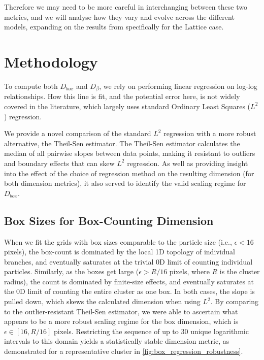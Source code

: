 \documentclass[12pt, a4paper, oneside]{report}
\theoremstyle{remark}
\begin{document}
Therefore we may need to be more careful in interchanging between these two metrics, and we will analyse how they vary and evolve across the different models, expanding on the results from \cite{Grebenkov2017} specifically for the Lattice case.

\section{Methodology}
\label{sec:dim_method}
To compute both $D_{box}$ and $D_\beta$, we rely on performing linear regression on log-log relationships. How this line is fit, and the potential error here, is not widely covered in the literature, which largely uses standard Ordinary Least Squares ($L^2$) regression.

We provide a novel comparison of the standard $L^2$ regression with a more robust alternative, the Theil-Sen estimator. The Theil-Sen estimator calculates the median of all pairwise slopes between data points, making it resistant to outliers and boundary effects that can skew $L^2$ regression. As well as providing insight into the effect of the choice of regression method on the resulting dimension (for both dimension metrics), it also served to identify the valid scaling regime for $D_{box}$.

\subsection{Box Sizes for Box-Counting Dimension}
When we fit the grids with box sizes comparable to the particle size (i.e., $\epsilon < 16$ pixels), the box-count is dominated by the local 1D topology of individual branches, and eventually saturates at the trivial 0D limit of counting individual particles. Similarly, as the boxes get large ($\epsilon > R/16$ pixels, where $R$ is the cluster radius), the count is dominated by finite-size effects, and eventually saturates at the 0D limit of counting the entire cluster as one box. In both cases, the slope is pulled down, which skews the calculated dimension when using $L^2$. 
By comparing to the outlier-resistant Theil-Sen estimator,  we were able to ascertain what appears to be a more robust scaling regime for the box dimension, which is $\epsilon \in [16, R/16]$ pixels. 
Restricting the sequence of up to 30 unique logarithmic intervals to this domain yields a statistically stable dimension metric, as demonstrated for a representative cluster in \cref{fig:box_regression_robustness}.
\end{document}
